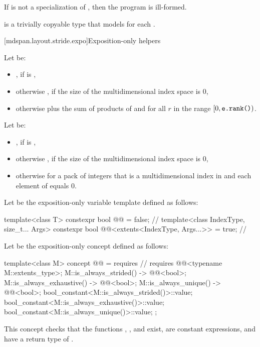\pnum
If  is not a specialization of ,
then the program is ill-formed.

\pnum
{} is a trivially copyable type
that models  for each .

[mdspan.layout.stride.expo]{Exposition-only helpers}

\pnum
Let  be:
\begin{itemize}
\item
{}, if  is ,
\item
otherwise , if the size of the multidimensional index space  is 0,
\item
otherwise  plus the sum of products of  and 
for all $r$ in the range $[0, \texttt{e.rank()})$.
\end{itemize}

\pnum
Let  be:
\begin{itemize}
\item
{}, if  is ,
\item
otherwise , if the size of the multidimensional index space  is 0,
\item
otherwise  for a pack of integers 
that is a multidimensional index in  and
each element of  equals 0.
\end{itemize}

\pnum
Let  be the exposition-only variable template
defined as follows:
\begin{codeblock}
template<class T>
  constexpr bool @@ = false;                              // \expos
template<class IndexType, size_t... Args>
  constexpr bool @@<extents<IndexType, Args...>> = true;  // \expos
\end{codeblock}

\pnum
Let  be the exposition-only concept
defined as follows:
\begin{codeblock}
template<class M>
concept @@ = requires {                         // \expos
  requires @@<typename M::extents_type>;
  { M::is_always_strided() } -> @@<bool>;
  { M::is_always_exhaustive() } -> @@<bool>;
  { M::is_always_unique() } -> @@<bool>;
  bool_constant<M::is_always_strided()>::value;
  bool_constant<M::is_always_exhaustive()>::value;
  bool_constant<M::is_always_unique()>::value;
};
\end{codeblock}
\begin{note}
This concept checks that the functions
,
, and
 exist,
are constant expressions, and
have a return type of .
\end{note}


